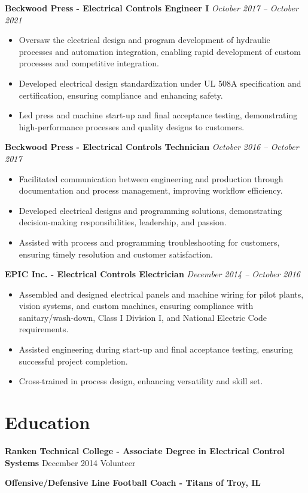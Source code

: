 \documentclass[letterpaper,10pt]{article} %
\newcommand{\job}[3]{
\textbf{#1 - #2} \hfill \textit{#3}
}
\newcommand{\education}[4]{
  \textbf{#1 - #2} \hfill #3
}
\begin{document}
\noindent\job{Beckwood Press}{Electrical Controls Engineer I}{October 2017 – October 2021}
\begin{itemize}[left=2em]
    \item Oversaw the electrical design and program development of hydraulic processes and automation integration, enabling rapid development of custom processes and competitive integration.
    \item Developed electrical design standardization under UL 508A specification and certification, ensuring compliance and enhancing safety.
    \item Led press and machine start-up and final acceptance testing, demonstrating high-performance processes and quality designs to customers.
\end{itemize}

\noindent\job{Beckwood Press}{Electrical Controls Technician}{October 2016 – October 2017}
\begin{itemize}[left=2em]
    \item Facilitated communication between engineering and production through documentation and process management, improving workflow efficiency.
    \item Developed electrical designs and programming solutions, demonstrating decision-making responsibilities, leadership, and passion.
    \item Assisted with process and programming troubleshooting for customers, ensuring timely resolution and customer satisfaction.
\end{itemize}

\noindent\job{EPIC Inc.}{Electrical Controls Electrician}{December 2014 – October 2016}
\begin{itemize}[left=2em]
    \item Assembled and designed electrical panels and machine wiring for pilot plants, vision systems, and custom machines, ensuring compliance with sanitary/wash-down, Class I Division I, and National Electric Code requirements.
    \item Assisted engineering during start-up and final acceptance testing, ensuring successful project completion.
    \item Cross-trained in process design, enhancing versatility and skill set.
\end{itemize}

\section{Education}
\education{Ranken Technical College}{Associate Degree in Electrical Control Systems}{December 2014}

\section{Volunteer}
\job{Offensive/Defensive Line Football Coach}{Titans of Troy, IL}{}
\end{document}
